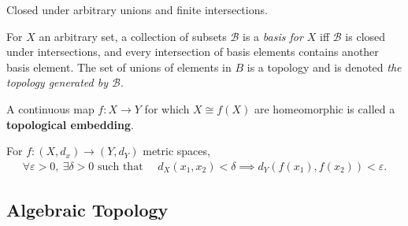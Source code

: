 \begin{definition}[Topology]

Closed under arbitrary unions and finite intersections.

\end{definition}

\begin{definition}

For \(X\) an arbitrary set, a collection of subsets \({\mathcal{B}}\) is
a \emph{basis for \(X\)} iff \({\mathcal{B}}\) is closed under
intersections, and every intersection of basis elements contains another
basis element. The set of unions of elements in \(B\) is a topology and
is denoted \emph{the topology generated by \({\mathcal{B}}\)}.

\end{definition}

\begin{definition}

A continuous map \(f:X \to Y\) for which \(X\cong f(X)\) are
homeomorphic is called a \textbf{topological embedding}.

\end{definition}

\begin{definition}

For \(f: (X, d_{x}) \to (Y, d_{Y})\) metric spaces,
\begin{align*}
\forall \varepsilon> 0, ~\exists \delta > 0 \text{ such that } \quad d_{X}(x_{1}, x_{2}) < \delta \implies d_{Y}(f(x_{1}), f(x_{2})) < \varepsilon
.\end{align*}

\end{definition}

\hypertarget{algebraic-topology}{%
\subsection{Algebraic Topology}\label{algebraic-topology}}

\begin{definition}[Acyclic]

\end{definition}


\begin{definition}

\end{definition}

